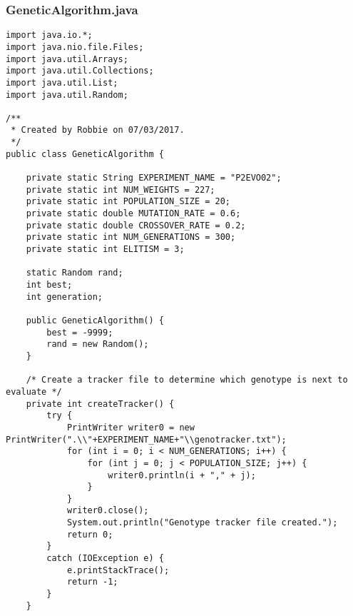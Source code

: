\documentclass[12pt,a4paper]{article}
\begin{document}
\subsubsection{GeneticAlgorithm.java}
\begin{lstlisting}
import java.io.*;
import java.nio.file.Files;
import java.util.Arrays;
import java.util.Collections;
import java.util.List;
import java.util.Random;

/**
 * Created by Robbie on 07/03/2017.
 */
public class GeneticAlgorithm {

    private static String EXPERIMENT_NAME = "P2EVO02";
    private static int NUM_WEIGHTS = 227;
    private static int POPULATION_SIZE = 20;
    private static double MUTATION_RATE = 0.6;
    private static double CROSSOVER_RATE = 0.2;
    private static int NUM_GENERATIONS = 300;
    private static int ELITISM = 3;

    static Random rand;
    int best;
    int generation;

    public GeneticAlgorithm() {
        best = -9999;
        rand = new Random();
    }

    /* Create a tracker file to determine which genotype is next to evaluate */
    private int createTracker() {
        try {
            PrintWriter writer0 = new PrintWriter(".\\"+EXPERIMENT_NAME+"\\genotracker.txt");
            for (int i = 0; i < NUM_GENERATIONS; i++) {
                for (int j = 0; j < POPULATION_SIZE; j++) {
                    writer0.println(i + "," + j);
                }
            }
            writer0.close();
            System.out.println("Genotype tracker file created.");
            return 0;
        }
        catch (IOException e) {
            e.printStackTrace();
            return -1;
        }
    }


\end{lstlisting}
\end{document}
